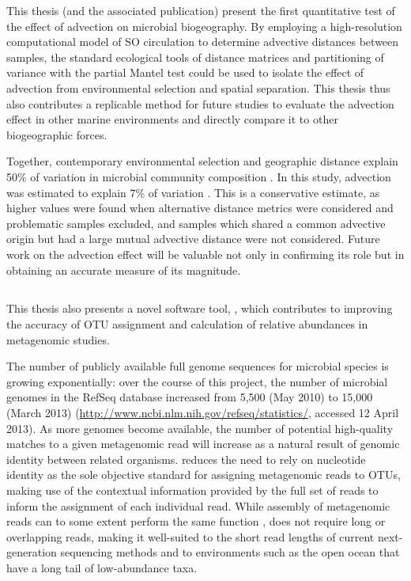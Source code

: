 This thesis (and the associated publication) present the first quantitative test of the effect of advection on microbial biogeography.
By employing a high-resolution computational model of \ac{SO} circulation to determine advective distances between samples, the standard ecological tools of distance matrices and partitioning of variance with the partial Mantel test could be used to isolate the effect of advection from environmental selection and spatial separation.
This thesis thus also contributes a replicable method for future studies to evaluate the advection effect in other marine environments and directly compare it to other biogeographic forces.

Together, contemporary environmental selection and geographic distance explain \textapprox{} 50\% of variation in microbial community composition \cite{Hanson:2012cb}.
In this study, advection was estimated to explain 7\% of variation .
This is a conservative estimate, as higher values were found when alternative distance metrics were considered and problematic samples excluded, and samples which shared a common advective origin but had a large mutual advective distance were not considered.
Future work on the advection effect will be valuable not only in confirming its role but in obtaining an accurate measure of its magnitude.



\subsection{}

This thesis also presents a novel software tool, , which contributes to improving the accuracy of \ac{OTU} assignment and calculation of relative abundances in metagenomic studies.

The number of publicly available full genome sequences for microbial species is growing exponentially: over the course of this project, the number of microbial genomes in the RefSeq database increased from 5,500 (May 2010) to 15,000 (March 2013) (\url{http://www.ncbi.nlm.nih.gov/refseq/statistics/}, accessed 12 April 2013).
As more genomes become available, the number of potential high-quality matches to a given metagenomic read will increase as a natural result of genomic identity between related organisms.
 reduces the need to rely on nucleotide identity as the sole objective standard for assigning metagenomic reads to \acp{OTU}, making use of the contextual information provided by the full set of reads to inform the assignment of each individual read.
While assembly of metagenomic reads can to some extent perform the same function \cite{Temperton:2012fj},  does not require long or overlapping reads, making it well-suited to the short read lengths of current next-generation sequencing methods and to environments such as the open ocean that have a long tail of low-abundance taxa.

